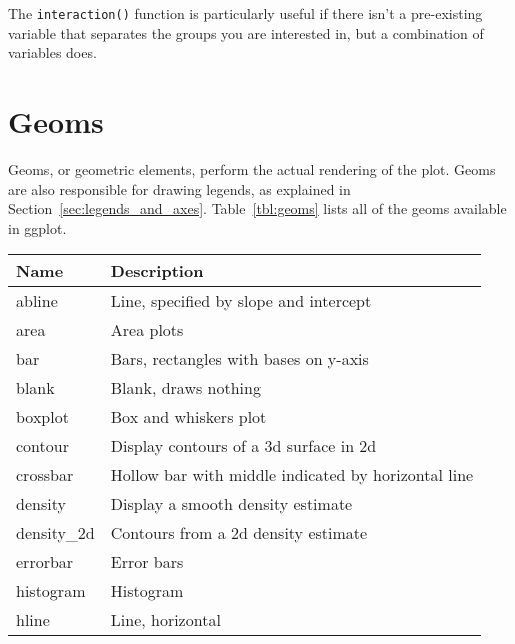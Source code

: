 The {\tt interaction()} function is particularly useful if there isn't a pre-existing variable that separates the groups you are interested in, but a combination of variables does.  

\section{Geoms}
\label{sec:geom}

Geoms, or geometric elements, perform the actual rendering of the plot. Geoms are also responsible for drawing legends, as explained in Section~\ref{sec:legends_and_axes}.  Table~\ref{tbl:geoms} lists all of the geoms available in ggplot.  

\begin{table}
  \begin{center}
  \begin{tabular}{lp{3in}}
      \toprule
      Name & Description \\
      \midrule
      abline       & Line, specified by slope and intercept                                       \\
      area         & Area plots                                                                   \\
      bar          & Bars, rectangles with bases on y-axis                                        \\
      blank        & Blank, draws nothing                                                         \\
      boxplot      & Box and whiskers plot                                                        \\
      contour      & Display contours of a 3d surface in 2d                                       \\
      crossbar     & Hollow bar with middle indicated by horizontal line                          \\
      density      & Display a smooth density estimate                                            \\
      density\_2d & Contours from a 2d density estimate                                          \\
      errorbar     & Error bars                                                                   \\
      histogram    & Histogram                                                                    \\
      hline        & Line, horizontal                                                             \\

\end{tabular}
\end{center}
\end{table}
